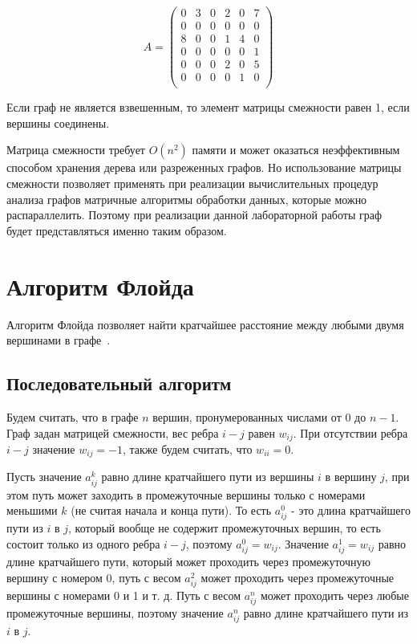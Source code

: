 \begin{equation}
	A = \begin{pmatrix}
		0 & 3 & 0 & 2 & 0 & 7\\
		0 & 0 & 0 & 0 & 0 & 0\\
		8 & 0 & 0 & 1 & 4 & 0\\
		0 & 0 & 0 & 0 & 0 & 1\\
		0 & 0 & 0 & 2 & 0 & 5\\
		0 & 0 & 0 & 0 & 1 & 0\\
	\end{pmatrix}
\end{equation}

Если граф не является взвешенным, то элемент матрицы смежности равен 1, если вершины соединены.

Матрица смежности требует $O(n^2)$ памяти и может оказаться неэффективным способом хранения дерева или разреженных графов. Но использование матрицы смежности позволяет применять при реализации вычислительных процедур анализа графов матричные алгоритмы обработки данных, которые можно распараллелить. Поэтому при реализации данной лабораторной работы граф будет представляться именно таким образом.

\section{Алгоритм Флойда}

Алгоритм Флойда позволяет найти кратчайшее расстояние между любыми двумя вершинами в графе~\cite{alg}.

\subsection*{Последовательный алгоритм}

Будем считать, что в графе $n$ вершин, пронумерованных числами от $0$ до $n - 1$. Граф задан матрицей смежности, вес ребра $i - j$ равен $w_{ij}$. При отсутствии ребра $i - j$ значение $w_{ij} = -1$, также будем считать, что $w_{ii} = 0$.

Пусть значение $a^k_{ij}$ равно длине кратчайшего пути из вершины $i$ в вершину $j$, при этом путь может заходить в промежуточные вершины только с номерами меньшими $k$ (не считая начала и конца пути). То есть $a^0_{ij}$ - это длина кратчайшего пути из $i$ в $j$, который вообще не содержит промежуточных вершин, то есть состоит только из одного ребра $i - j$, поэтому $a^0_{ij} = w_{ij}$. Значение $a^1_{ij} = w_{ij}$ равно длине кратчайшего пути, который может проходить через промежуточную вершину с номером 0, путь с весом $a^2_{ij}$ может проходить через промежуточные вершины с номерами 0 и 1 и т. д. Путь с весом $a^n_{ij}$ может проходить через любые промежуточные вершины, поэтому значение $a^n_{ij}$ равно длине кратчайшего пути из $i$ в $j$.

